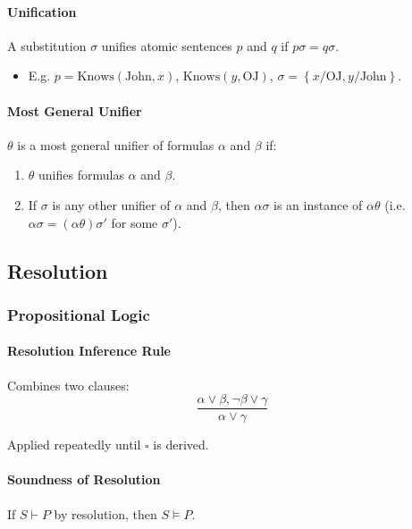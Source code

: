 \documentclass[twocolumn,english]{article}
\begin{document}
\paragraph{Unification}

A substitution $\sigma$ unifies atomic sentences $p$ and $q$ if
$p\sigma=q\sigma$.
\begin{itemize}
\item E.g. $p=\text{Knows}\left(\text{John},x\right)$, $\text{Knows}\left(y,\text{OJ}\right)$,
$\sigma=\left\{ x/\text{OJ},y/\text{John}\right\} $.
\end{itemize}

\paragraph{Most General Unifier}

$\theta$ is a most general unifier of formulas $\alpha$ and $\beta$
if:
\begin{enumerate}
\item $\theta$ unifies formulas $\alpha$ and $\beta$.
\item If $\sigma$ is any other unifier of $\alpha$ and $\beta$, then
$\alpha\sigma$ is an instance of $\alpha\theta$ (i.e. $\alpha\sigma=\left(\alpha\theta\right)\sigma'$
for some $\sigma'$).
\end{enumerate}

\subsection{Resolution}

\subsubsection{Propositional Logic}

\paragraph{Resolution Inference Rule}

Combines two clauses:
\[
\dfrac{\alpha\lor\beta,\lnot\beta\lor\gamma}{\alpha\lor\gamma}
\]

Applied repeatedly until $\square$ is derived.

\paragraph{Soundness of Resolution}

If $S\vdash P$ by resolution, then $S\vDash P$.
\end{document}
